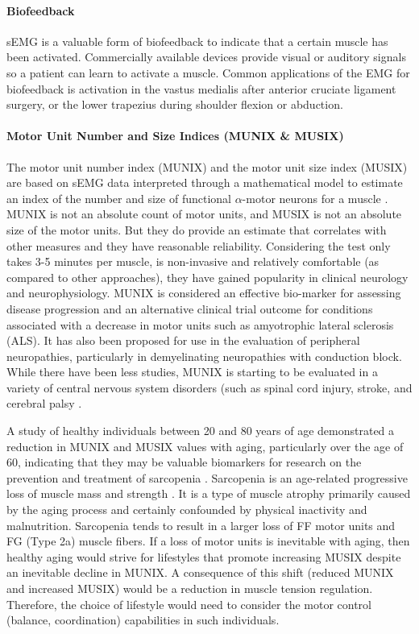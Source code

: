 \paragraph{Biofeedback}

sEMG is a valuable form of biofeedback to indicate that a certain muscle has been activated. Commercially available devices provide visual or auditory signals so a patient can learn to activate a muscle. Common applications of the EMG for biofeedback is activation in the vastus medialis after anterior cruciate ligament surgery, or the lower trapezius during shoulder flexion or abduction.

\paragraph{Motor Unit Number and Size Indices (MUNIX \& MUSIX)}

The motor unit number index (MUNIX) and the motor unit size index (MUSIX) are based on sEMG data interpreted through a mathematical model to estimate an index of the number and size of functional $\alpha$-motor neurons for a muscle \cite{nandedkar_motor_2004}. MUNIX is not an absolute count of motor units, and MUSIX is not an absolute size of the motor units. But they do provide an estimate that correlates with other measures and they have reasonable reliability. Considering the test only takes 3-5 minutes per muscle, is non-invasive and relatively comfortable (as compared to other approaches), they have gained popularity in clinical neurology and neurophysiology. MUNIX is considered an effective bio-marker for assessing disease progression and an alternative clinical trial outcome for conditions associated with a decrease in motor units such as amyotrophic lateral sclerosis (ALS). It has also been proposed for use in the evaluation of peripheral neuropathies, particularly in demyelinating neuropathies with conduction block. While there have been less studies, MUNIX is starting to be evaluated in a variety of central nervous system disorders (such as spinal cord injury, stroke, and cerebral palsy \cite{fatehi_utility_2018}. 

A study of healthy individuals between 20 and 80 years of age demonstrated a reduction in MUNIX and MUSIX values with aging, particularly over the age of 60, indicating that they may be valuable biomarkers for research on the prevention and treatment of sarcopenia \cite{cao_reference_2020}. Sarcopenia is an age-related progressive loss of muscle mass and strength \cite{dao_sarcopenia_2020}. It is a type of muscle atrophy primarily caused by the aging process and certainly confounded by physical inactivity and malnutrition. Sarcopenia tends to result in a larger loss of FF motor units and FG (Type 2a) muscle fibers. If a loss of motor units is inevitable with aging, then healthy aging would strive for lifestyles that promote increasing MUSIX despite an inevitable decline in MUNIX. A consequence of this shift (reduced MUNIX and increased MUSIX) would be a reduction in muscle tension regulation. Therefore, the choice of lifestyle would need to consider the motor control (balance, coordination) capabilities in such individuals.

